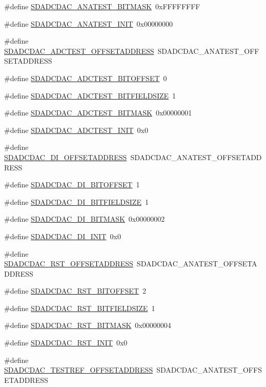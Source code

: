 \begin{DoxyCompactItemize}
\#define \hyperlink{a00569_aca6676b56d5f035ed0c7cee3378b7d1e}{SDADCDAC\_\-ANATEST\_\-BITMASK}~0xFFFFFFFF
\item 
\#define \hyperlink{a00569_aa32a9a2e11ac0aee33c2205afe00d6b0}{SDADCDAC\_\-ANATEST\_\-INIT}~0x00000000
\item 
\#define \hyperlink{a00569_a1e310f8c14636f31dac98074e1228712}{SDADCDAC\_\-ADCTEST\_\-OFFSETADDRESS}~SDADCDAC\_\-ANATEST\_\-OFFSETADDRESS
\item 
\#define \hyperlink{a00569_a08fb4076c169200f47234cbfca943474}{SDADCDAC\_\-ADCTEST\_\-BITOFFSET}~0
\item 
\#define \hyperlink{a00569_ab3a7ebe14ae8d3c4c5d012f701b7950b}{SDADCDAC\_\-ADCTEST\_\-BITFIELDSIZE}~1
\item 
\#define \hyperlink{a00569_ae17d3753e70f45600c5ff04dcd91da03}{SDADCDAC\_\-ADCTEST\_\-BITMASK}~0x00000001
\item 
\#define \hyperlink{a00569_af7424f193cef2c8a200c8ae824a61bf8}{SDADCDAC\_\-ADCTEST\_\-INIT}~0x0
\item 
\#define \hyperlink{a00569_aa4ad52f37658babf6a5b678a863427b3}{SDADCDAC\_\-DI\_\-OFFSETADDRESS}~SDADCDAC\_\-ANATEST\_\-OFFSETADDRESS
\item 
\#define \hyperlink{a00569_aa0767da2f2ff325a0469240d0e5c5e35}{SDADCDAC\_\-DI\_\-BITOFFSET}~1
\item 
\#define \hyperlink{a00569_a277406588fdc58c97e8b689d6a460f52}{SDADCDAC\_\-DI\_\-BITFIELDSIZE}~1
\item 
\#define \hyperlink{a00569_a90bb7ee94b945f9fd18b861ce49d8171}{SDADCDAC\_\-DI\_\-BITMASK}~0x00000002
\item 
\#define \hyperlink{a00569_a469d28834c182a793131dd293f4cfc3a}{SDADCDAC\_\-DI\_\-INIT}~0x0
\item 
\#define \hyperlink{a00569_a9b16319621ea08f4cf0a4bda0fdeec1a}{SDADCDAC\_\-RST\_\-OFFSETADDRESS}~SDADCDAC\_\-ANATEST\_\-OFFSETADDRESS
\item 
\#define \hyperlink{a00569_a1f334b7b06698b0f756b859156cb894f}{SDADCDAC\_\-RST\_\-BITOFFSET}~2
\item 
\#define \hyperlink{a00569_a2d91812a6cf72facacceaef78dae3145}{SDADCDAC\_\-RST\_\-BITFIELDSIZE}~1
\item 
\#define \hyperlink{a00569_a7f395ab5ca58a1f9d2a64017f76828a3}{SDADCDAC\_\-RST\_\-BITMASK}~0x00000004
\item 
\#define \hyperlink{a00569_a6f9532d79f98bbb21dd652d9633f8fec}{SDADCDAC\_\-RST\_\-INIT}~0x0
\item 
\#define \hyperlink{a00569_a545d610c190ce5456b227a31311eaff1}{SDADCDAC\_\-TESTREF\_\-OFFSETADDRESS}~SDADCDAC\_\-ANATEST\_\-OFFSETADDRESS

\end{DoxyCompactItemize}
